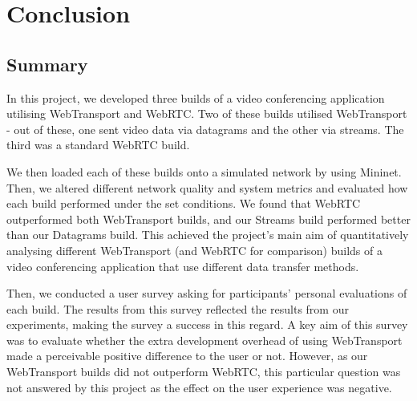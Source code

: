
\chapter{Conclusion}    

\section{Summary}
In this project, we developed three builds of a video conferencing application utilising WebTransport and WebRTC. Two of these builds utilised WebTransport - out of these, one sent video data via datagrams and the other via streams. The third was a standard WebRTC build. 

We then loaded each of these builds onto a simulated network by using Mininet. Then, we altered different network quality and system metrics and evaluated how each build performed under the set conditions. We found that WebRTC outperformed both WebTransport builds, and our Streams build performed better than our Datagrams build. This achieved the project's main aim of quantitatively analysing different WebTransport (and WebRTC for comparison) builds of a video conferencing application that use different data transfer methods. 

Then, we conducted a user survey asking for participants' personal evaluations of each build. The results from this survey reflected the results from our experiments, making the survey a success in this regard. A key aim of this survey was to evaluate whether the extra development overhead of using WebTransport made a perceivable positive difference to the user or not. However, as our WebTransport builds did not outperform WebRTC, this particular question was not answered by this project as the effect on the user experience was negative. 


